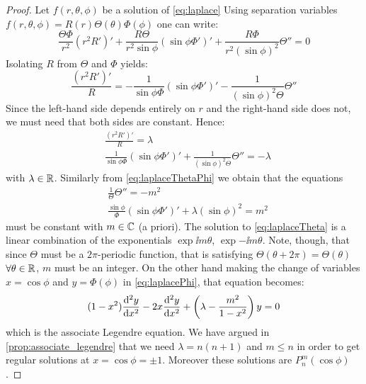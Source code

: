 \documentclass[../main.tex]{subfiles}
\begin{document}
\begin{proof}
  Let $f(r,\theta,\phi)$ be a solution of \cref{eq:laplace} Using separation variables $f(r,\theta,\phi)=R(r)\Theta(\theta)\Phi(\phi)$ one can write:
  \begin{equation}
    \frac{\Theta\Phi}{r^2}{(r^2R')}'+\frac{R\Theta}{r^2\sin\phi}{(\sin\phi\Phi')}'+\frac{R\Phi}{r^2{(\sin\phi)}^2}\Theta''=0
  \end{equation}
  Isolating $R$ from $\Theta$ and $\Phi$ yields:
  \begin{equation}
    \frac{{(r^2R')}'}{R}=-\frac{1}{\sin\phi\Phi}{(\sin\phi\Phi')}'-\frac{1}{{(\sin\phi)}^2\Theta}\Theta''
  \end{equation}
  Since the left-hand side depends entirely on $r$ and the right-hand side does not, we must need that both sides are constant. Hence:
  \begin{align}
    \label{eq:laplaceR}        & \frac{{(r^2R')}'}{R}=\lambda                                                               \\
    \label{eq:laplaceThetaPhi} & \frac{1}{\sin\phi\Phi}{(\sin\phi\Phi')}'+\frac{1}{{(\sin\phi)}^2\Theta}\Theta''  =-\lambda
  \end{align}
  with $\lambda\in\mathbb{R}$. Similarly from \cref{eq:laplaceThetaPhi} we obtain that the equations
  \begin{align}
    \label{eq:laplaceTheta} & \frac{1}{\Theta}\Theta''  =-m^2                                     \\
    \label{eq:laplacePhi}   & \frac{\sin\phi}{\Phi}{(\sin\phi\Phi')}'+\lambda{(\sin\phi)}^2  =m^2
  \end{align}
  must be constant with $m\in\mathbb{C}$ (a priori). The solution to \cref{eq:laplaceTheta} is a linear combination of the exponentials $\exp{\ii m\theta}$, $\exp{-\ii m\theta}$. Note, though, that since $\Theta$ must be a $2\pi$-periodic function, that is satisfying $\Theta(\theta+2\pi)=\Theta(\theta)$ $\forall\theta\in\mathbb{R}$, $m$ must be an integer. On the other hand making the change of variables $x=\cos \phi$ and $y=\Phi(\phi)$ in \cref{eq:laplacePhi}, that equation becomes:
  \begin{equation}
    (1-x^2)\dv[2]{y}{x}-2x\dv[2]{y}{x}+\left(\lambda-\frac{m^2}{1-x^2}\right)y=0
  \end{equation}
  which is the associate Legendre equation. We have argued in \cref{prop:associate_legendre} that we need $\lambda=n(n+1)$ and $m\leq n$ in order to get regular solutions at $x=\cos\phi=\pm 1$. Moreover these solutions are $P_n^m(\cos\phi)$.


\end{proof}
\end{document}
